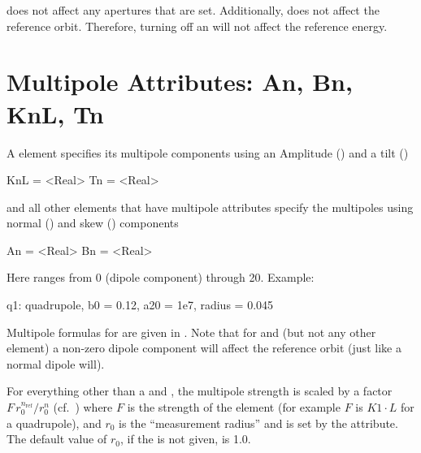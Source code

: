  does not affect any apertures that are set. Additionally,
 does not affect the reference orbit. Therefore, turning 
off an  will not affect the reference energy.

\section{Multipole Attributes: An, Bn, KnL, Tn}
\label{s:multip}

A  element specifies its multipole components using an
Amplitude () and a tilt ()
\begin{example}
  KnL = <Real>
  Tn  = <Real>
\end{example}
 and all other elements that
have multipole attributes specify the multipoles using normal
() and skew () components 
\begin{example}
  An = <Real>
  Bn = <Real>
\end{example}
Here  ranges from 0
(dipole component) through 20. Example:
\begin{example}
  q1: quadrupole, b0 = 0.12, a20 = 1e7, radius = 0.045
\end{example}

Multipole formulas for are given in .  Note that for
 and  (but not any other element) a
non-zero dipole component will affect the reference orbit (just like a
normal dipole will).

For everything other than a  and , the
multipole strength is scaled by a factor $F \, r_0^{n_\text{ref}} /
r_0^n$ (cf.~) where $F$ is the strength of the element (for
example $F$ is $K1 \cdot L$ for a quadrupole), and $r_0$ is the
``measurement radius'' and is set by the  attribute. The
default value of $r_0$, if the  is not given, is 1.0.
